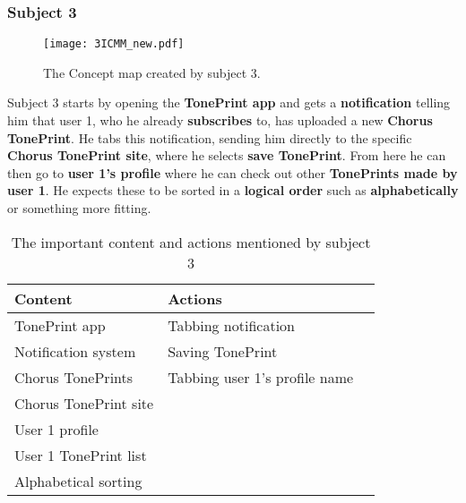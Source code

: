 \subsubsection{Subject 3}
\label{Subject3}
%
\begin{figure}[H]
	\centering
	\texttt{[image: 3ICMM\_new.pdf]}
	\caption{The Concept map created by subject 3.}
	\label{fig:ICMM3}
\end{figure}
%
Subject 3 starts by opening the \textbf{TonePrint app} and gets a \textbf{notification} telling him that user 1, who he already \textbf{subscribes} to, has uploaded a new \textbf{Chorus TonePrint}. He tabs this notification, sending him directly to the specific \textbf{Chorus TonePrint site}, where he selects \textbf{save TonePrint}. From here he can then go to \textbf{user 1's profile} where he can check out other \textbf{TonePrints made by user 1}. He expects these to be sorted in a \textbf{logical order} such as \textbf{alphabetically} or something more fitting. \\
%
\begin{table}[H]
\begin{minipage}[b]{\linewidth}\centering
	\begin{tabular} {|l|l|l|} \hline
		\rowcolor{xGray25} \textbf{Content} & \textbf{Actions} \\  \hline
		TonePrint app & Tabbing notification \\
		Notification system & Saving TonePrint \\
		Chorus TonePrints & Tabbing user 1's profile name \\
		Chorus TonePrint site &  \\
		User 1 profile &  \\
		User 1 TonePrint list &  \\
		Alphabetical sorting &  \\ \hline
	\end{tabular}
	\caption{The important content and actions mentioned by subject 3}
	\label{tab:Subject3ContentActions}
\end{minipage}
\end{table}


